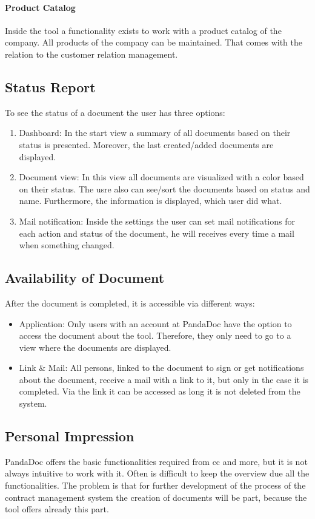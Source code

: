 \paragraph{Product Catalog}
Inside the tool a functionality exists to work with a product catalog of the company. All products of the company can be maintained. That comes with the relation to the customer relation management.

\subsection{Status Report}
To see the status of a document the user has three options:
\begin{enumerate}
	\item Dashboard: In the start view a summary of all documents based on their status is presented. Moreover, the last created/added documents are displayed.
	\item Document view: In this view all documents are visualized with a color based on their status. The usre also can see/sort the documents based on status and name. Furthermore, the information is displayed, which user did what.
	\item Mail notification: Inside the settings the user can set mail notifications for each action and status of the document, he will receives every time a mail when something changed.
\end{enumerate}

\subsection{Availability of Document}
After the document is completed, it is accessible via different ways:
\begin{itemize}
	\item Application: Only users with an account at PandaDoc have the option to access the document about the tool. Therefore, they only need to go to a view where the documents are displayed. 
	\item Link \& Mail: All persons, linked to the document to sign or get notifications about the document, receive a mail with a link to it, but only in the case it is completed. Via the link it can be accessed as long it is not deleted from the system.
\end{itemize} 

\subsection{Personal Impression}
PandaDoc offers the basic functionalities required from \gls{cc} and more, but it is not always intuitive to work with it. Often is difficult to keep the overview due all the functionalities. The problem is that for further development of the process of the contract management system the creation of documents  will be part, because the tool offers already this part.